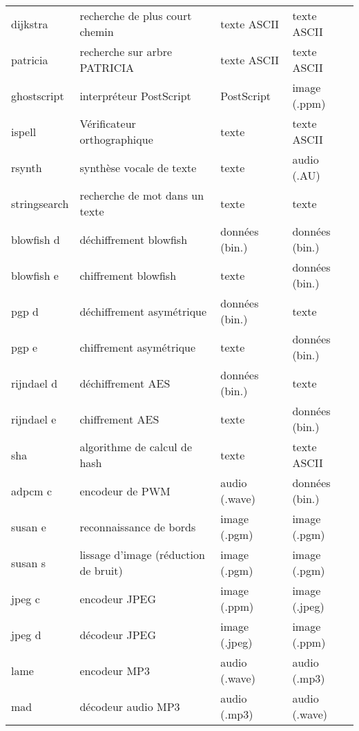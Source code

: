 \documentclass[french, a4paper, 11pt, twoside, pdftex]{StyleThese}
\begin{document}
\begin{longtable}{@{}llll@{}}
		dijkstra     & recherche de plus court chemin		& texte ASCII        & texte ASCII      \\
		patricia     & recherche sur arbre PATRICIA			& texte ASCII        & texte ASCII      \\
		ghostscript  & interpréteur PostScript              & PostScript		 & image (.ppm)     \\
		ispell       & Vérificateur orthographique          & texte              & texte ASCII		\\
		rsynth       & synthèse vocale de texte             & texte              & audio (.AU)      \\
		stringsearch & recherche de mot dans un texte		& texte              & texte            \\
		blowfish d   & déchiffrement blowfish               & données (bin.)  	 & données (bin.)   \\
		blowfish e   & chiffrement blowfish                 & texte              & données (bin.)   \\
		pgp d        & déchiffrement asymétrique      		& données (bin.)  	 & texte            \\
		pgp e        & chiffrement asymétrique				& texte              & données (bin.)   \\
		rijndael d   & déchiffrement AES                    & données (bin.)  	 & texte            \\
		rijndael e   & chiffrement AES                      & texte              & données (bin.)   \\
		sha          & algorithme de calcul de hash			& texte              & texte ASCII      \\
		adpcm c      & encodeur de PWM                      & audio (.wave)      & données (bin.)   \\
		susan e      & reconnaissance de bords              & image (.pgm)       & image (.pgm)     \\
		susan s      & lissage d'image (réduction de bruit) & image (.pgm)       & image (.pgm)     \\
		jpeg c       & encodeur JPEG                        & image (.ppm)       & image (.jpeg)    \\
		jpeg d       & décodeur JPEG                        & image (.jpeg)      & image (.ppm)     \\
		lame         & encodeur MP3                         & audio (.wave)      & audio (.mp3)     \\
		mad          & décodeur audio MP3                   & audio (.mp3)       & audio (.wave)    \\

\end{longtable}
\end{document}
